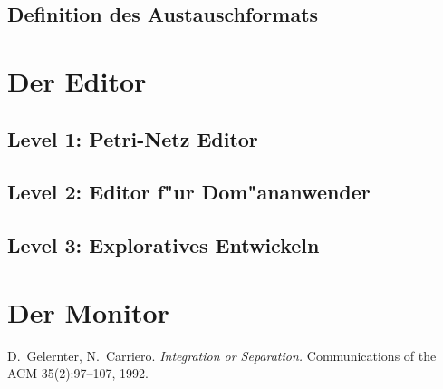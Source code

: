 \documentclass[a4paper,12pt]{article}
\begin{document}
\subsection{Definition des Austauschformats}

\section{Der Editor}
\subsection{Level 1: Petri-Netz Editor}
\subsection{Level 2: Editor f"ur Dom"ananwender}
\subsection{Level 3: Exploratives Entwickeln}

\section{Der Monitor}

\renewcommand{\bibname}{Literatur}
\begin{thebibliography}{\quad}

D.~Gelernter, N.~Carriero. \emph{Integration or
    Separation.} Communications of the ACM 35(2):97--107, 1992.

\end{thebibliography}
\end{document}
